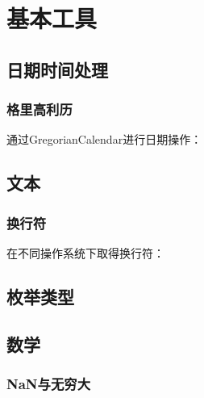 \chapter{基本工具}



\section{日期时间处理}



\subsection{格里高利历}

通过GregorianCalendar进行日期操作：





\section{文本}



\subsection{换行符}

在不同操作系统下取得换行符：





\section{枚举类型}









\section{数学}



\subsection{NaN与无穷大}

